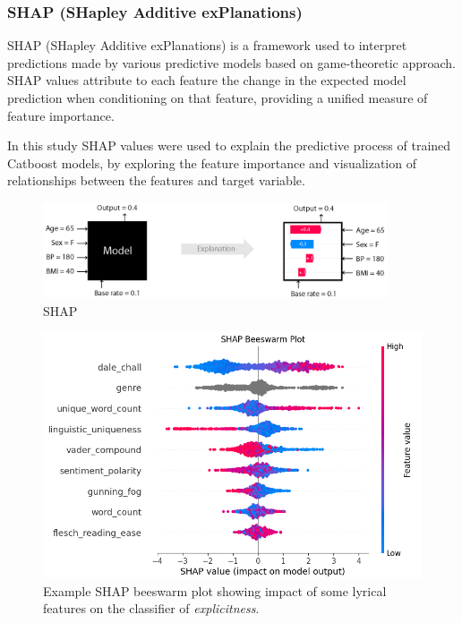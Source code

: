 \subsubsection*{SHAP (SHapley Additive exPlanations)}

SHAP (SHapley Additive exPlanations) is a framework used to interpret
predictions made by various predictive models based on game-theoretic approach.
SHAP values attribute to each feature the change in the expected model
prediction when conditioning on that feature, providing a unified measure
of feature importance.\cite{shap}

In this study SHAP values were used to explain the predictive process
of trained Catboost models, by exploring the feature importance and
visualization of relationships between the features and target variable.

\begin{center}
  \begin{figure}[H]
  \centering
  \includegraphics[width=4in]{img/shap_intro.png}
  \caption{SHAP}
  \label{Figure:fig_beh}
\end{figure}
\end{center}

\begin{center}
  \begin{figure}[H]
  \centering
  \includegraphics[width=4.5in]{img/shap_beeswarm.png}
  \caption{Example SHAP beeswarm plot showing impact of some lyrical features
  on the classifier of \textit{explicitness}.}
  \label{Figure:fig_beh}
\end{figure}
\end{center}


